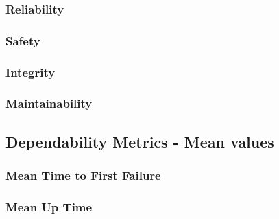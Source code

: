 \subsubsection{Reliability}

\subsubsection{Safety}

\subsubsection{Integrity}

\subsubsection{Maintainability}


\subsection{Dependability Metrics - Mean values}

\subsubsection{Mean Time to First Failure}

\subsubsection{Mean Up Time}

